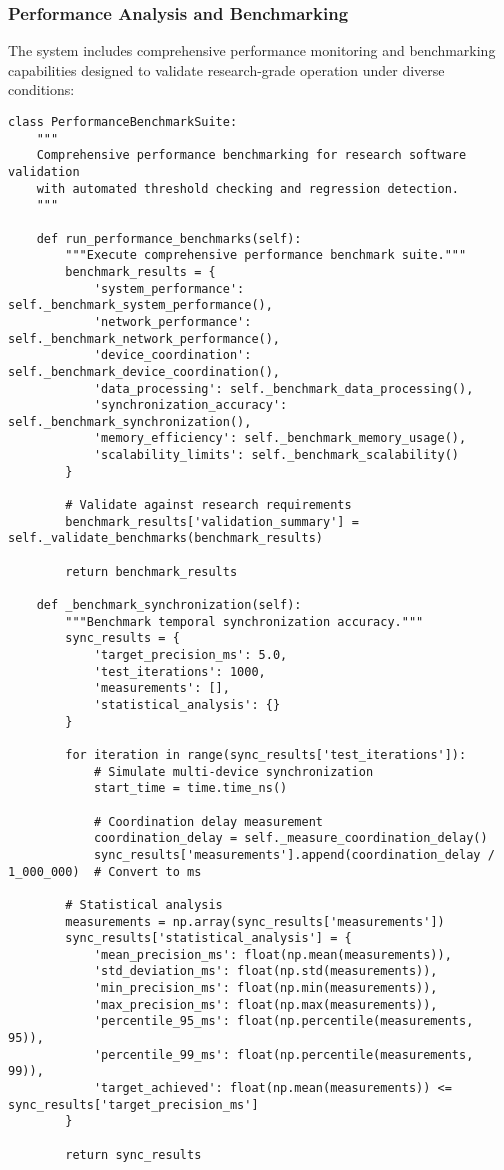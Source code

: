 \documentclass[11pt,a4paper]{article}
\begin{document}
\subsubsection{Performance Analysis and Benchmarking}

The system includes comprehensive performance monitoring and benchmarking capabilities designed to validate
research-grade operation under diverse conditions:

\begin{verbatim}
class PerformanceBenchmarkSuite:
    """
    Comprehensive performance benchmarking for research software validation
    with automated threshold checking and regression detection.
    """

    def run_performance_benchmarks(self):
        """Execute comprehensive performance benchmark suite."""
        benchmark_results = {
            'system_performance': self._benchmark_system_performance(),
            'network_performance': self._benchmark_network_performance(),
            'device_coordination': self._benchmark_device_coordination(),
            'data_processing': self._benchmark_data_processing(),
            'synchronization_accuracy': self._benchmark_synchronization(),
            'memory_efficiency': self._benchmark_memory_usage(),
            'scalability_limits': self._benchmark_scalability()
        }

        # Validate against research requirements
        benchmark_results['validation_summary'] = self._validate_benchmarks(benchmark_results)

        return benchmark_results

    def _benchmark_synchronization(self):
        """Benchmark temporal synchronization accuracy."""
        sync_results = {
            'target_precision_ms': 5.0,
            'test_iterations': 1000,
            'measurements': [],
            'statistical_analysis': {}
        }

        for iteration in range(sync_results['test_iterations']):
            # Simulate multi-device synchronization
            start_time = time.time_ns()

            # Coordination delay measurement
            coordination_delay = self._measure_coordination_delay()
            sync_results['measurements'].append(coordination_delay / 1_000_000)  # Convert to ms

        # Statistical analysis
        measurements = np.array(sync_results['measurements'])
        sync_results['statistical_analysis'] = {
            'mean_precision_ms': float(np.mean(measurements)),
            'std_deviation_ms': float(np.std(measurements)),
            'min_precision_ms': float(np.min(measurements)),
            'max_precision_ms': float(np.max(measurements)),
            'percentile_95_ms': float(np.percentile(measurements, 95)),
            'percentile_99_ms': float(np.percentile(measurements, 99)),
            'target_achieved': float(np.mean(measurements)) <= sync_results['target_precision_ms']
        }

        return sync_results
\end{verbatim}
\end{document}
